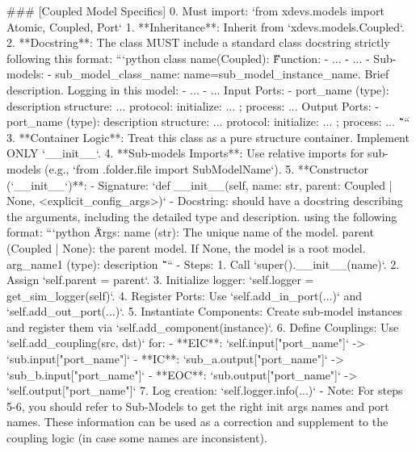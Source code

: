 \begin{promptbox}
### [Coupled Model Specifics]
0. Must import: `from xdevs.models import Atomic, Coupled, Port`
1. **Inheritance**: Inherit from `xdevs.models.Coupled`.
2. **Docstring**: The class MUST include a standard class docstring strictly following this format:
    ```python
    class {name}(Coupled):
        \"\"\"
        Function: 
          - ...
          - ...
          - Sub-models: 
            - sub_model_class_name: name=sub_model_instance_name. Brief description.
        Logging in this model:
          - ...
          - ...
        Input Ports:
          - port_name (type): description
            structure: ...
            protocol: initialize: ... ; process: ...
        Output Ports:
          - port_name (type): description
            structure: ...
            protocol: initialize: ... ; process: ...
        \"\"\"
    ```
3. **Container Logic**: Treat this class as a pure structure container. Implement ONLY `__init__`.
4. **Sub-models Imports**: Use relative imports for sub-models (e.g., `from .folder.file import SubModelName`).
5. **Constructor (`__init__`)**:
    - Signature: `def __init__(self, name: str, parent: Coupled | None, <explicit_config_args>)`
    - Docstring: should have a docstring describing the arguments, including the detailed type and description. using the following format:
        ```python
        \"\"\"
        Args:
            name (str): The unique name of the model.
            parent (Coupled | None): the parent model. If None, the model is a root model.
            arg_name1 (type): description
        \"\"\"
        ```
    - Steps:
        1. Call `super().__init__(name)`.
        2. Assign `self.parent = parent`.
        3. Initialize logger: `self.logger = get_sim_logger(self)`.
        4. Register Ports: Use `self.add_in_port(...)` and `self.add_out_port(...)`.
        5. Instantiate Components: Create sub-model instances and register them via `self.add_component(instance)`.
        6. Define Couplings: Use `self.add_coupling(src, dst)` for:
            - **EIC**: `self.input["port_name"]` -> `sub.input["port_name"]`
            - **IC**: `sub_a.output["port_name"]` -> `sub_b.input["port_name"]`
            - **EOC**: `sub.output["port_name"]` -> `self.output["port_name"]`
        7. Log creation: `self.logger.info(...)`
    - Note: For steps 5-6, you should refer to Sub-Models to get the right init args names and port names. These information can be used as a correction and supplement to the coupling logic (in case some names are inconsistent). 
\end{promptbox}


